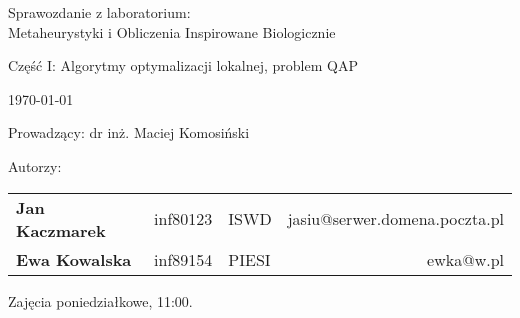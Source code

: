 \thispagestyle{empty} %

\begin{center}
{\large{Sprawozdanie z laboratorium:\\
Metaheurystyki i Obliczenia Inspirowane Biologicznie}}

\vspace{3ex}

Część I: Algorytmy optymalizacji lokalnej, problem QAP

\vspace{3ex}
{\footnotesize\today}

\end{center}


\vspace{10ex}

Prowadzący: dr inż. Maciej Komosiński

\vspace{5ex}

Autorzy:
\begin{tabular}{lllr}
\textbf{Jan Kaczmarek} & inf80123 & ISWD & jasiu@serwer.domena.poczta.pl \\
\textbf{Ewa Kowalska} & inf89154 & PIESI & ewka@w.pl \\
\end{tabular}

\vspace{5ex}

Zajęcia poniedziałkowe, 11:00.


\newpage

